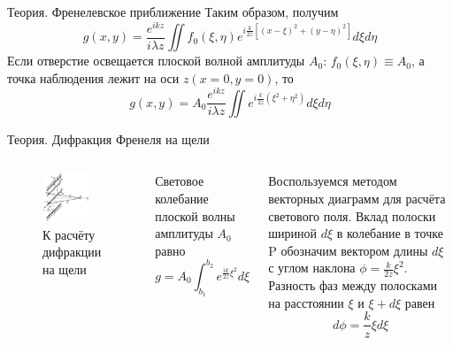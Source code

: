 \documentclass[11pt]{beamer} %
\begin{document}
    \begin{frame}{Теория. Френелевское приближение}
        Таким образом, получим
        \begin{equation}
            g(x,y) = \frac{e^{ikz}}{i\lambda z}\iint f_0(\xi,\eta)e^{i\frac{k}{2z} \left[ (x-\xi)^2 + (y - \eta)^2 \right] }d\xi d\eta
        \end{equation}
        Если отверстие освещается плоской волной амплитуды $A_0$: $f_0(\xi, \eta) \equiv A_0$, а точка наблюдения лежит на оси $z (x=0, y=0)$, то
        \begin{equation}
            g(x,y) = A_0\frac{e^{ikz}}{i\lambda z}\iint e^{i\frac{k}{2z} (\xi^2 + \eta^2) }d\xi d\eta
        \end{equation}
    \end{frame}

    \begin{frame}{Теория. Дифракция Френеля на щели}
        \begin{columns}
            \begin{figure}[H]
            \centering
                \includegraphics[width = 0.8\textwidth]{images/theory_fresnel_slit.png}
                \caption{К расчёту дифракции на щели}
            \end{figure}

            Световое колебание плоской волны амплитуды $A_0$ равно
            \begin{equation}
                g = A_0\int_{b_1}^{b_2}e^{\frac{ik}{2z}\xi^2}d\xi
            \end{equation}

            Воспользуемся методом векторных диаграмм для расчёта светового поля. Вклад полоски шириной $d\xi$ в колебание в точке P обозначим вектором длины $d\xi$ с углом наклона $\phi = \frac{k}{2z}\xi^2$. Разность фаз между полосками на расстоянии $\xi$ и $\xi+d\xi$ равен 
            \begin{equation}
                d\phi=\frac{k}{z}\xi d\xi
            \end{equation}
        \end{columns}
    \end{frame}
\end{document}
